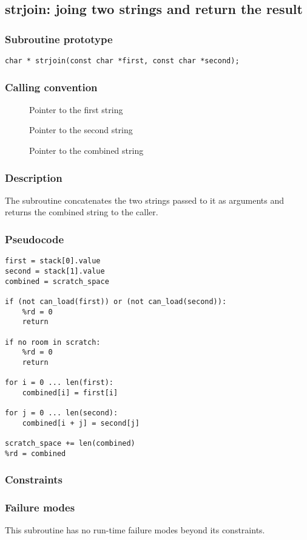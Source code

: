 \clearpage
{}
{}
\label{subr:strjoin}
\subsection*{strjoin: joing two strings and return the result}

\subsubsection*{Subroutine prototype}

\begin{verbatim}
char * strjoin(const char *first, const char *second);
\end{verbatim}

\subsubsection*{Calling convention}

\begin{description}
\item[] Pointer to the first string
\item[] Pointer to the second string
\item[] Pointer to the combined string
\end{description}

\subsubsection*{Description}

The  subroutine concatenates the two strings
passed to it as arguments and returns the combined string to the
caller.

\subsubsection*{Pseudocode}

\begin{verbatim}
first = stack[0].value
second = stack[1].value
combined = scratch_space

if (not can_load(first)) or (not can_load(second)):
    %rd = 0
    return

if no room in scratch:
    %rd = 0
    return

for i = 0 ... len(first):
    combined[i] = first[i]

for j = 0 ... len(second):
    combined[i + j] = second[j]

scratch_space += len(combined)
%rd = combined
\end{verbatim}

\subsubsection*{Constraints}

\subsubsection*{Failure modes}

This subroutine has no run-time failure modes beyond its constraints.
